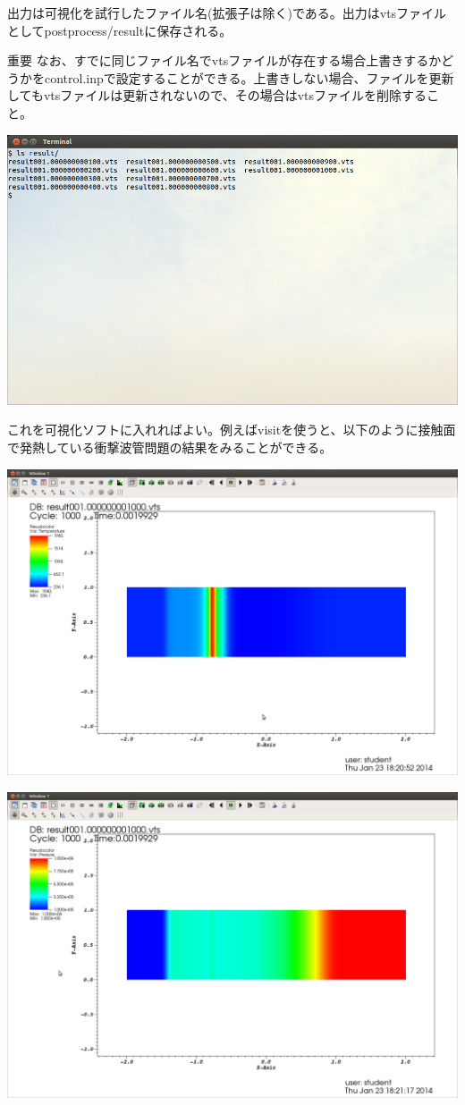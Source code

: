 \documentclass{jsarticle}
\begin{document}
出力は可視化を試行したファイル名(拡張子は除く)である。出力はvtsファイルとしてpostprocess/resultに保存される。
\begin{itembox}[l]{重要}
なお、すでに同じファイル名でvtsファイルが存在する場合上書きするかどうかをcontrol.inpで設定することができる。上書きしない場合、ファイルを更新してもvtsファイルは更新されないので、その場合はvtsファイルを削除すること。
\end{itembox}
\begin{center}
\includegraphics[width=.8\textwidth,bb=0 0 962 577]{tutorial_img/260.png}
\end{center}
これを可視化ソフトに入れればよい。例えばvisitを使うと、以下のように接触面で発熱している衝撃波管問題の結果をみることができる。
\begin{center}
\includegraphics[width=.7\textwidth,bb=0 0 1522 1056]{tutorial_img/270.png}
\end{center}
\begin{center}
\includegraphics[width=.7\textwidth,bb=0 0 1522 1056]{tutorial_img/280.png}
\end{center}
\end{document}
